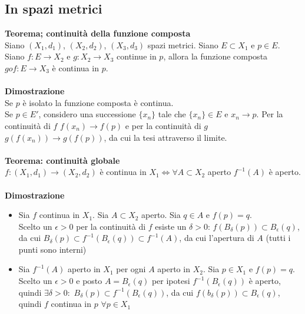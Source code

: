 \documentclass{article}
\begin{document}
\subsection{In spazi metrici}
\textbf{Teorema; continuità della funzione composta}\\
Siano $(X_1,d_1)$, $(X_2,d_2)$, $(X_3,d_3)$ spazi metrici. Siano $E\subset X_1$ e $p\in E$. Siano $f:E\rightarrow X_2$ e $g:X_2\rightarrow X_3$ continue in $p$, allora la funzione composta $gof:E\rightarrow X_3$ è continua in $p$.\\\\
\textbf{Dimostrazione}\\
Se $p$ è isolato la funzione composta è continua.\\
Se $p\in E'$, considero una successione $\{x_n\}$ tale che $\{x_n\}\in E$ e $x_n\rightarrow p$. Per la continuità di $f$ $f(x_n)\rightarrow f(p)$ e per la continuità di $g$ $g(f(x_n))\rightarrow g(f(p))$, da cui la tesi attraverso il limite.\\
\\
\textbf{Teorema: continuità globale}\\
$f:(X_1,d_1)\rightarrow(X_2,d_2)$ è continua in $X_1\Leftrightarrow\forall A\subset X_2$ aperto $f^{-1}(A)$ è aperto.\\\\
\textbf{Dimostrazione}
\begin{itemize}
    \item Sia $f$ continua in $X_1$. Sia $A\subset X_2$ aperto. Sia $q\in A$ e $f(p)=q$.\\
    Scelto un $\epsilon>0$ per la continuità di $f$ esiste un $\delta>0$: $f(B_\delta(p))\subset B_\epsilon(q)$, da cui $B_\delta(p)\subset f^{-1}(B_\epsilon(q))\subset f^{-1}(A)$, da cui l'apertura di $A$ (tutti i punti sono interni)
    
    \item Sia $f^{-1}(A)$ aperto in $X_1$ per ogni $A$ aperto in $X_2$. Sia $p\in X_1$ e $f(p)=q$.\\
    Scelto un $\epsilon>0$ e posto $A=B_\epsilon(q)$ per ipotesi $f^{-1}(B_\epsilon(q))$ è aperto, quindi $\exists\delta>0:$ $B_\delta(p)\subset f^{-1}(B_\epsilon(q))$, da cui $f(b_\delta(p))\subset B_\epsilon(q)$, quindi $f$ continua in $p$ $\forall p\in X_1$
\end{itemize}
\end{document}

